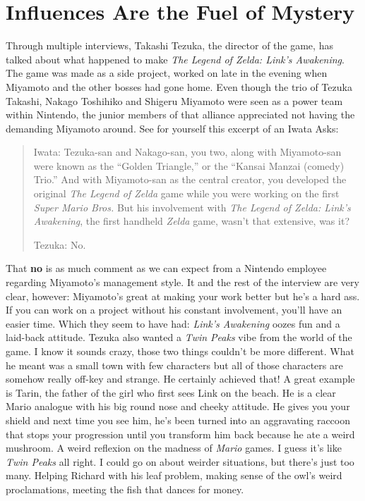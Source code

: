 \documentclass{book}
\begin{document}
\FloatBarrier\needspace{5pt}\section*{Influences Are the Fuel of Mystery}\nopagebreak[4]

Through multiple interviews, Takashi Tezuka, the director of the game, has talked about what happened to make \emph{The Legend of Zelda: Link’s Awakening}. The game was made as a side project, worked on late in the evening when Miyamoto and the other bosses had gone home. Even though the trio of Tezuka Takashi, Nakago Toshihiko and Shigeru Miyamoto were seen as a power team within Nintendo, the junior members of that alliance appreciated not having the demanding Miyamoto around. See for yourself this excerpt of an Iwata Asks:

\begin{quote}
Iwata: Tezuka-san and Nakago-san, you two, along with Miyamoto-san were known as the “Golden Triangle,” or the “Kansai Manzai (comedy) Trio.” And with Miyamoto-san as the central creator, you developed the original \emph{The Legend of Zelda} game while you were working on the first \emph{Super Mario Bros.} But his involvement with \emph{The Legend of Zelda: Link’s Awakening}, the first handheld \emph{Zelda} game, wasn’t that extensive, was it?

Tezuka: No.
\end{quote} \par

That \textbf{no} is as much comment as we can expect from a Nintendo employee regarding Miyamoto’s management style. It and the rest of the interview are very clear, however: Miyamoto’s great at making your work better but he’s a hard ass. If you can work on a project without his constant involvement, you’ll have an easier time. Which they seem to have had: \emph{Link’s Awakening} oozes fun and a laid-back attitude. Tezuka also wanted a \emph{Twin Peaks} vibe from the world of the game. I know it sounds crazy, those two things couldn’t be more different. What he meant was a small town with few characters but all of those characters are somehow really off-key and strange. He certainly achieved that! A great example is Tarin, the father of the girl who first sees Link on the beach. He is a clear Mario analogue with his big round nose and cheeky attitude. He gives you your shield and next time you see him, he’s been turned into an aggravating raccoon that stops your progression until you transform him back because he ate a weird mushroom. A weird reflexion on the madness of \emph{Mario} games. I guess it’s like \emph{Twin Peaks} all right. I could go on about weirder situations, but there’s just too many. Helping Richard with his leaf problem, making sense of the owl’s weird proclamations, meeting the fish that dances for money.
\end{document}
